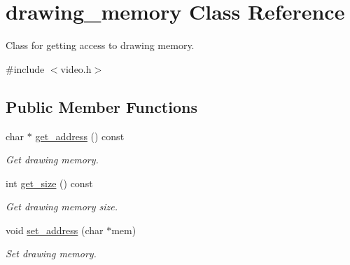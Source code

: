 \hypertarget{classdrawing__memory}{}\section{drawing\+\_\+memory Class Reference}
\label{classdrawing__memory}


Class for getting access to drawing memory.  




{\ttfamily \#include $<$video.\+h$>$}

\subsection*{Public Member Functions}
\begin{DoxyCompactItemize}
\item 
\hypertarget{classdrawing__memory_aa734f5302fb195a3241609a583aa2640}{}char $\ast$ \hyperlink{classdrawing__memory_aa734f5302fb195a3241609a583aa2640}{get\+\_\+address} () const \label{classdrawing__memory_aa734f5302fb195a3241609a583aa2640}

\begin{DoxyCompactList}\small\item\em Get drawing memory. \end{DoxyCompactList}\item 
\hypertarget{classdrawing__memory_aa336efcdde8b4684ea78a5d8bd294ebc}{}int \hyperlink{classdrawing__memory_aa336efcdde8b4684ea78a5d8bd294ebc}{get\+\_\+size} () const \label{classdrawing__memory_aa336efcdde8b4684ea78a5d8bd294ebc}

\begin{DoxyCompactList}\small\item\em Get drawing memory size. \end{DoxyCompactList}\item 
\hypertarget{classdrawing__memory_a3568bd1fd5c14f7ae56454773b34bf76}{}void \hyperlink{classdrawing__memory_a3568bd1fd5c14f7ae56454773b34bf76}{set\+\_\+address} (char $\ast$mem)\label{classdrawing__memory_a3568bd1fd5c14f7ae56454773b34bf76}

\begin{DoxyCompactList}\small\item\em Set drawing memory. \end{DoxyCompactList}\end{DoxyCompactItemize}

